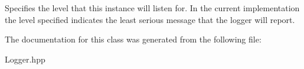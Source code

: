 Specifies the level that this instance will listen for. In the current implementation the level specified indicates the least serious message that the logger will report.

The documentation for this class was generated from the following file:\begin{CompactItemize}
\item 
Logger.hpp\end{CompactItemize}
